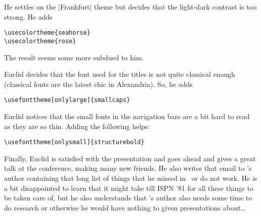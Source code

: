 He settles on the |Frankfurt| theme but decides that the light-dark
contrast is too strong. He adds
\begin{verbatim}
\usecolortheme{seahorse}
\usecolortheme{rose} 
\end{verbatim}  
The result seems some more subdued to him.

Euclid decides that the font used for the titles is not quite
classical enough (classical fonts are the latest chic in
Alexandria). So, he adds
\begin{verbatim}
\usefonttheme[onlylarge]{smallcaps}
\end{verbatim}

Euclid notices that the small fonts in the navigation bars
are a bit hard to read as they are so thin. Adding the following
helps:
\begin{verbatim}
\usefonttheme[onlysmall]{structurebold}
\end{verbatim}


Finally, Euclid is satisfied with the presentation and goes ahead and
gives a great talk at the conference, making many new friends. He also
writes that email to \beamer's author containing that long list of
things that he missed in \beamer\ or do not work. He is a bit
disappointed to learn that it might take till ISPN '81 for all these
things to be taken care of, but he also understands that \beamer's
author also needs some time to do research or otherwise he would have
nothing to given presentations about\dots 

